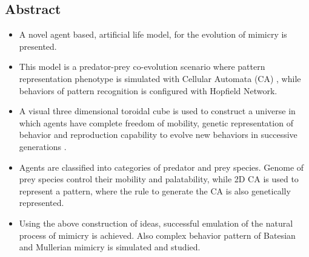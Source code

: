 \documentclass[a0,landscape]{a0poster}
\begin{document}
\begin{multicols}{5} %



\color{Navy} %

\section*{Abstract}

\begin{itemize}
	\item A novel agent based, artificial life model, for the evolution of mimicry is presented.
	\item This model is a predator-prey co-evolution scenario where pattern representation phenotype is simulated with Cellular Automata (CA) \citep{Wolfram2002}, while behaviors of pattern recognition is configured with Hopfield Network.
	\item A visual three dimensional toroidal cube is used to construct a universe in which agents have complete freedom of mobility, genetic representation of behavior and reproduction capability to evolve new behaviors in successive generations \citep{grogono2003}.
	\item Agents are classified into categories of predator and prey species. Genome of prey species control their mobility and palatability, while 2D CA is used to represent a pattern, where the rule to generate the CA is also genetically represented.
	\item Using the above construction of ideas, successful emulation of the natural process of mimicry is achieved. Also complex behavior pattern of Batesian and Mullerian mimicry is simulated and studied.
\end{itemize}


\end{multicols}
\end{document}
